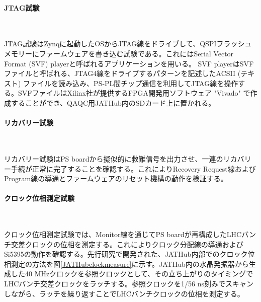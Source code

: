 \paragraph{JTAG試験}　\par
JTAG試験はZynqに起動したOSからJTAG線をドライブして、QSPIフラッシュメモリーにファームウェアを書き込む試験である。これにはSerial Vector Format (SVF) playerと呼ばれるアプリケーションを用いる。
SVF playerはSVFファイルと呼ばれる、JTAG4線をドライブするパターンを記述したACSII (テキスト) ファイルを読み込み、PS-PL間チップ通信を利用してJTAG線を操作する。SVFファイルはXilinx社が提供するFPGA開発用ソフトウェア "Vivado" で作成することができ、QAQC用JATHub内のSDカード上に置かれる。

\paragraph{リカバリー試験}　\par
リカバリー試験はPS boardから擬似的に救難信号を出力させ、一連のリカバリー手続が正常に完了することを確認する。これによりRecovery Request線およびProgram線の導通とファームウェアのリセット機構の動作を検証する。

\paragraph{クロック位相測定試験}　\par
クロック位相測定試験では、Monitor線を通じてPS boardが再構成したLHCバンチ交差クロックの位相を測定する。これによりクロック分配線の導通およびSi5395の動作を確認する。先行研究で開発された、JATHub内部でのクロック位相測定の方法を図\ref{JATHubclockmeasure}に示す。JATHub内の水晶発振器から生成した40 MHzクロックを参照クロックとして、その立ち上がりのタイミングでLHCバンチ交差クロックをラッチする。参照クロックを1/56 ns刻みでスキャンしながら、ラッチを繰り返すことでLHCバンチクロックの位相を測定する。

